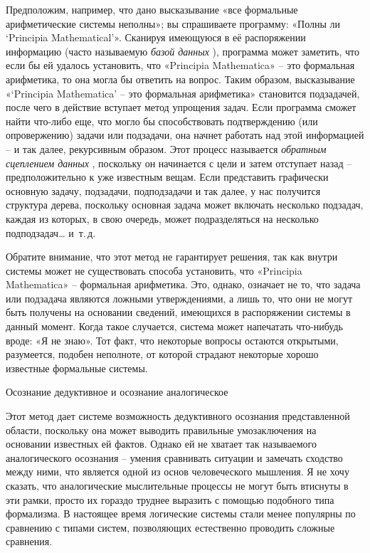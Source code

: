 \documentclass[../main.tex]{subfiles}
\begin{document}
Предположим, например, что дано высказывание «все формальные арифметические системы неполны»; вы спрашиваете программу: «Полны ли \enquote*{Principia Mathematical}». Сканируя имеющуюся в её распоряжении информацию (часто называемую \emph{базой данных} ), программа может заметить, что если бы ей удалось установить, что «Principia Mathematica» \--- это формальная арифметика, то она могла бы ответить на вопрос. Таким образом, высказывание «\enquote*{Principia Mathematica} \--- это формальная арифметика» становится подзадачей, после чего в действие вступает метод упрощения задач. Если программа сможет найти что-либо еще, что могло бы способствовать подтверждению (или опровержению) задачи или подзадачи, она начнет работать над этой информацией \--- и так далее, рекурсивным образом. Этот процесс называется \emph{обратным сцеплением данных} , поскольку он начинается с цели и затем отступает назад \--- предположительно к уже известным вещам. Если представить графически основную задачу, подзадачи, подподзадачи и так далее, у нас получится структура дерева, поскольку основная задача может включать несколько подзадач, каждая из которых, в свою очередь, может подразделяться на несколько подподзадач\ldots{} и~т.\,д.

Обратите внимание, что этот метод не гарантирует решения, так как внутри системы может не существовать способа установить, что «Principia Mathematica» \--- формальная арифметика. Это, однако, означает не то, что задача или подзадача являются ложными утверждениями, а лишь то, что они не могут быть получены на основании сведений, имеющихся в распоряжении системы в данный момент. Когда такое случается, система может напечатать что-нибудь вроде: «Я не знаю». Тот факт, что некоторые вопросы остаются открытыми, разумеется, подобен неполноте, от которой страдают некоторые хорошо известные формальные системы.

Осознание дедуктивное и осознание аналогическое

Этот метод дает системе возможность дедуктивного осознания представленной области, поскольку она может выводить правильные умозаключения на основании известных ей фактов. Однако ей не хватает так называемого аналогического осознания \--- умения сравнивать ситуации и замечать сходство между ними, что является одной из основ человеческого мышления. Я не хочу сказать, что аналогические мыслительные процессы не могут быть втиснуты в эти рамки, просто их гораздо труднее выразить с помощью подобного типа формализма. В настоящее время логические системы стали менее популярны по сравнению с типами систем, позволяющих естественно проводить сложные сравнения.
\end{document}
